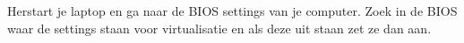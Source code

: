 Herstart je laptop en ga naar de BIOS settings van je computer. Zoek in de BIOS waar de settings staan voor virtualisatie en als deze uit staan zet ze dan aan.
